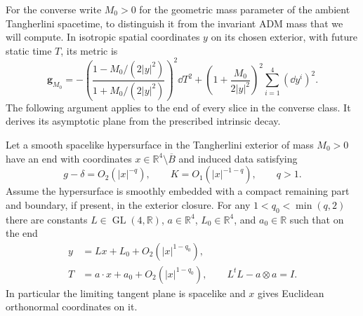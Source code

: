 For the converse write $M_0>0$ for the geometric mass parameter of the
ambient Tangherlini spacetime, to distinguish it from the invariant ADM mass
that we will compute.  In isotropic spatial coordinates $y$ on its chosen
exterior, with future static time $T$, its metric is
\begin{equation}
 \mathbf g_{M_0}
 =-\left(\frac{1-M_0/(2|y|^2)}{1+M_0/(2|y|^2)}\right)^2\dd T^2
   +\left(1+\frac{M_0}{2|y|^2}\right)^2
       \sum_{i=1}^4(\dd y^i)^2.
 \label{q4:rec:isotropic-spacetime}
\end{equation}
The following argument applies to the end of every slice in the converse
class.  It derives its asymptotic plane from the prescribed intrinsic decay.

\begin{lemma}
\label{q4:rec:asymptotic-plane}
Let a smooth spacelike hypersurface in the Tangherlini exterior of mass
$M_0>0$ have an end with coordinates $x\in\mathbb R^4\setminus\overline B$
and induced data satisfying
\[
 g-\delta=O_2(|x|^{-q}),\qquad K=O_1(|x|^{-1-q}),\qquad q>1.
\]
Assume the hypersurface is smoothly embedded with a compact remaining part
and boundary, if present, in the exterior closure.  For any
$1<q_0<\min(q,2)$ there are constants
$L\in\operatorname{GL}(4,\mathbb R)$, $a\in\mathbb R^4$,
$L_0\in\mathbb R^4$, and $a_0\in\mathbb R$ such that on the end
\begin{equation}
 \begin{split}
 y&=Lx+L_0+O_2(|x|^{1-q_0}),\\
 T&=a\cdot x+a_0+O_2(|x|^{1-q_0}),\qquad
 L^tL-a\otimes a=I.
 \end{split}
 \label{q4:rec:affine-plane}
\end{equation}
In particular the limiting tangent plane is spacelike and $x$ gives
Euclidean orthonormal coordinates on it.
\end{lemma}

